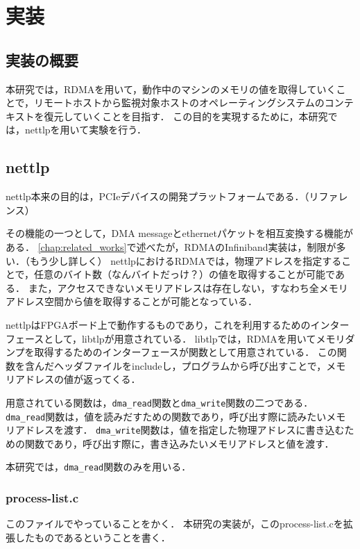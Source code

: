 \chapter{実装}
\label{chap:implementation}

\section{実装の概要}

本研究では，RDMAを用いて，動作中のマシンのメモリの値を取得していくことで，リモートホストから監視対象ホストのオペレーティングシステムのコンテキストを復元していくことを目指す．
この目的を実現するために，本研究では，nettlpを用いて実験を行う．

\section{nettlp}
\label{section:nettlp}

nettlp本来の目的は，PCIeデバイスの開発プラットフォームである．（リファレンス）

その機能の一つとして，DMA messageとethernetパケットを相互変換する機能がある．
\ref{chap:related_works}で述べたが，RDMAのInfiniband実装は，制限が多い．（もう少し詳しく）
nettlpにおけるRDMAでは，物理アドレスを指定することで，任意のバイト数（なんバイトだっけ？）の値を取得することが可能である．
また，アクセスできないメモリアドレスは存在しない，すなわち全メモリアドレス空間から値を取得することが可能となっている．

nettlpはFPGAボード上で動作するものであり，これを利用するためのインターフェースとして，libtlpが用意されている．
libtlpでは，RDMAを用いてメモリダンプを取得するためのインターフェースが関数として用意されている．
この関数を含んだヘッダファイルをincludeし，プログラムから呼び出すことで，メモリアドレスの値が返ってくる．

用意されている関数は，\verb|dma_read|関数と\verb|dma_write|関数の二つである．
\verb|dma_read|関数は，値を読みだすための関数であり，呼び出す際に読みたいメモリアドレスを渡す．
\verb|dma_write|関数は，値を指定した物理アドレスに書き込むための関数であり，呼び出す際に，書き込みたいメモリアドレスと値を渡す．

本研究では，\verb|dma_read|関数のみを用いる．

\subsection{process-list.c}

このファイルでやっていることをかく．
本研究の実装が，このprocess-list.cを拡張したものであるということを書く．

